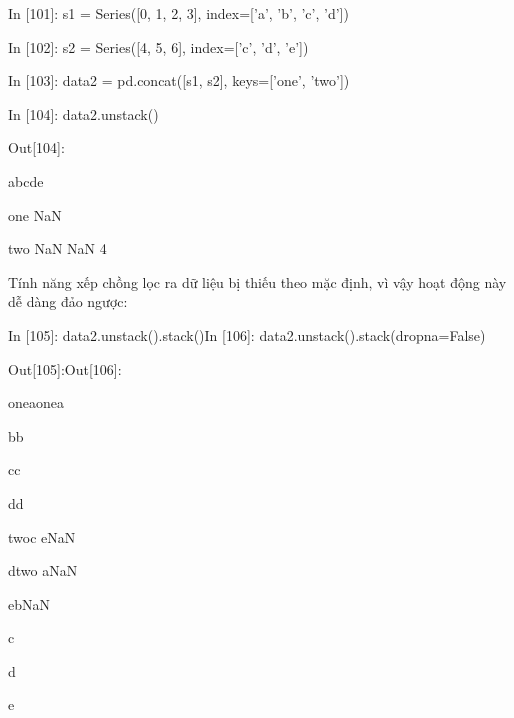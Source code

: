 \par\quad\textup In [101]: s1 = Series([0, 1, 2, 3], index=['a', 'b', 'c', 'd'])
\par\quad\textup In [102]: s2 = Series([4, 5, 6], index=['c', 'd', 'e'])
\par\quad\textup In [103]: data2 = pd.concat([s1, s2], keys=['one', 'two'])
\par\quad\textup In [104]: data2.unstack()
\par\quad\textup Out[104]:
\par\quad\textup\quad\quad\quad\xspace a\quad b\quad c\quad d\quad e
\par\quad\textup one\quad{} NaN
\par\quad\textup two NaN NaN\xspace\xspace 4
\par\quad\textup Tính năng xếp chồng lọc ra dữ liệu bị thiếu theo mặc định, vì vậy hoạt động này dễ dàng đảo ngược:
\par\quad\textup In [105]: data2.unstack().stack()\quad\quad In [106]: data2.unstack().stack(dropna=False)
\par\quad\textup Out[105]:\quad\quad\quad\quad\quad\quad\quad\quad\quad\quad\quad Out[106]:
\par\quad\xspace one\quad a\quad\quad\quad\quad\quad\quad\quad\quad\quad\quad\quad one\quad a
\par\quad\quad\quad\xspace b\quad\quad\quad\quad\quad\quad\quad\quad\quad\quad\quad\quad\quad\quad b
\par\quad\quad\quad\xspace c\quad\quad\quad\quad\quad\quad\quad\quad\quad\quad\quad\quad\quad\quad c
\par\quad\quad\quad d\quad\quad\quad\quad\quad\quad\quad\quad\quad\quad\quad\quad\quad\quad d
\par\quad two\quad c\quad\quad\quad\quad\quad\quad\quad\quad\quad\quad\quad\quad\quad\xspace\xspace e\quad NaN
\par\quad\quad\quad d\quad\quad\quad\quad\quad\quad\quad\quad\quad\quad\quad two \quad a\quad NaN
\par\quad\quad\quad e\quad\quad\quad\quad\quad\quad\quad\quad\quad\quad\quad\quad\quad\quad b\quad NaN
\par\quad\quad\quad \quad\quad\quad\quad\quad\quad\quad\quad\quad\quad\quad\quad\quad\quad\quad\quad c
\par\quad\quad\quad\quad\quad\quad\quad\quad\quad\quad\quad\quad\quad\quad\quad\quad\quad\quad\quad d
\par\quad\quad\quad\quad\quad\quad\quad\quad\quad\quad\quad\quad\quad\quad\quad\quad\quad\quad\quad e
